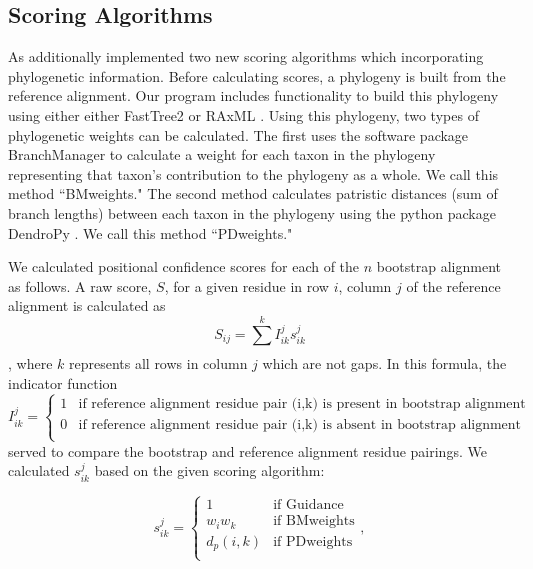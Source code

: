 \documentclass[10pt]{article}
\begin{document}
\subsection*{Scoring Algorithms}
As additionally implemented two new scoring algorithms which incorporating phylogenetic information. Before calculating scores, a phylogeny is built from the reference alignment. Our program includes functionality to build this phylogeny using either either FastTree2 \citep{Price2010} or RAxML \citep{Stamatakis2006}. Using this phylogeny, two types of phylogenetic weights can be calculated. The first uses the software package BranchManager \citep{Stone2007} to calculate a weight for each taxon in the phylogeny representing that taxon's contribution to the phylogeny as a whole. We call this method ``BMweights." The second method calculates patristic distances (sum of branch lengths) between each taxon in the phylogeny using the python package DendroPy \citep{Sukumaran2010}. We call this method ``PDweights."

We calculated positional confidence scores for each of the $n$ bootstrap alignment as follows. A raw score, $S$, for a given residue in row $i$, column $j$ of the reference alignment is calculated as \begin{equation} S_{ij} = \sum\limits_{}^k I_{ik}^j s_{ik}^j \end{equation}, where $k$ represents all rows in column $j$ which are not gaps. 
In this formula, the indicator function 
\begin{equation}I_{ik}^j = \left\{ \begin{array}{rl}

              1                         &\mbox{if reference alignment residue pair (i,k) is present in bootstrap alignment} \\
              0            &\mbox{if reference alignment residue pair (i,k) is absent in bootstrap alignment} \\
                     \end{array} \right. 
\end{equation}
served to compare the bootstrap and reference alignment residue pairings.
We calculated $s_{ik}^j$ based on the given scoring algorithm:

\begin{equation}
s_{ik}^j = \left\{ \begin{array}{rl}

              1                         &\mbox{if Guidance} \\
              w_iw_k              &\mbox{if BMweights} \\
              d_p(i,k)              &\mbox{if PDweights} \\
                     \end{array} \right.,
\end{equation}
\end{document}
